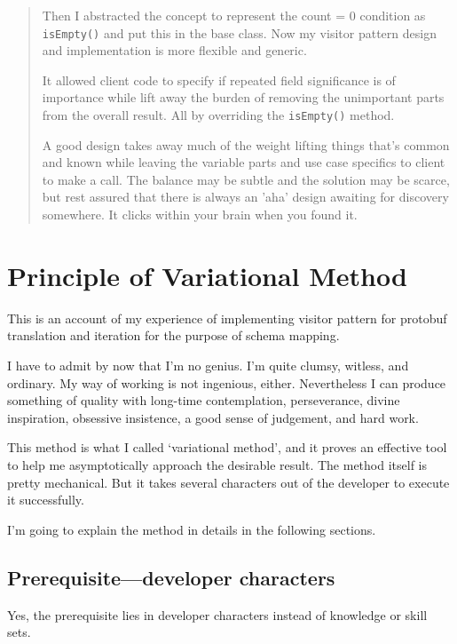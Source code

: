 \documentclass[oneside,11pt]{book}
\theoremstyle{definition}
\theoremstyle{remark}
\newcommand{\code}[1]{\mbox{\lstinline{#1}}}
\begin{document}
\begin{quotation}
    Then I abstracted the concept to represent the count = 0 condition as \code{isEmpty()} and put
    this in the base class.
    Now my visitor pattern design and implementation is more flexible and generic.

    It allowed client code to specify if repeated field significance is of importance while lift
    away the burden of removing the unimportant parts from the overall result.
    All by overriding the \code{isEmpty()} method.

    A good design takes away much of the weight lifting things that's common and known while leaving
    the variable parts and use case specifics to client to make a call.
    The balance may be subtle and
    the solution may be scarce, but rest assured that there is always an 'aha' design awaiting
    for discovery somewhere.
    It clicks within your brain when you found it.
\end{quotation}

\section{Principle of Variational Method}\label{sec:principleOfVariationalMethod}

This is an account of my experience of implementing visitor pattern for protobuf translation and
iteration for the purpose of schema mapping.

I have to admit by now that I'm no genius.
I'm quite clumsy, witless, and ordinary.
My way of working is not ingenious, either.
Nevertheless I can produce something of quality with long-time contemplation,
perseverance, divine inspiration, obsessive insistence, a good sense of judgement, and hard work.

This method is what I called `variational method', and it proves an effective tool to help
me asymptotically approach the desirable result.
The method itself is pretty mechanical.
But it takes several characters out of the developer to execute it successfully.

I'm going to explain the method in details in the following sections.

\subsection{Prerequisite---developer characters}\label{subsec:prerequisiteDeveloperCharacters}

Yes, the prerequisite lies in developer characters instead of knowledge or skill sets.
\end{document}
